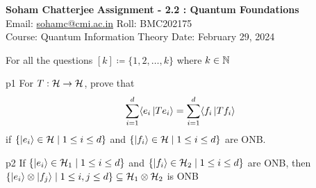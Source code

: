 \documentclass[a4paper, 11pt]{article}
\begin{document}
	
	
	\textsf{\noindent \large\textbf{Soham Chatterjee} \hfill \textbf{Assignment - 2.2 : Quantum Foundations}\\
		Email: \href{sohamc@cmi.ac.in}{sohamc@cmi.ac.in} \hfill Roll: BMC202175\\
		\normalsize Course: Quantum Information Theory \hfill Date: February 29, 2024}
\vspace{1cm}

For all the questions $[k]\coloneqq \{1,2,\dots,k\}$ where $k\in\mathbb{N}$
	
\begin{problem}{%
	}{p1%
}
For $T:\mathcal{H}\to \mathcal{H}$, prove that  $$\sum_{i=1}^d\langle e_i\ket{Te_i}=\sum_{i=1}^d \langle f_i\ket{Tf_i}$$if $\{\ket{e_i}\in \mathcal{H}\mid 1\leq i\leq d\}$ and $\{\ket{f_i}\in \mathcal{H}\mid 1\leq i\leq d\}$ are ONB.
\end{problem}
	

\begin{problem}{%
	}{p2%
}
If $\{\ket{e_i}\in \mathcal{H}_1\mid 1\leq i\leq d\}$ and $\{\ket{f_i}\in \mathcal{H}_2\mid 1\leq i\leq d\}$ are ONB, then  $\{  \ket{e_i}\otimes \ket{f_j}\mid 1\leq i,j\leq d\}\subseteq \mathcal{H}_1\otimes \mathcal{H}_2$ is ONB
\end{problem}
\end{document}
